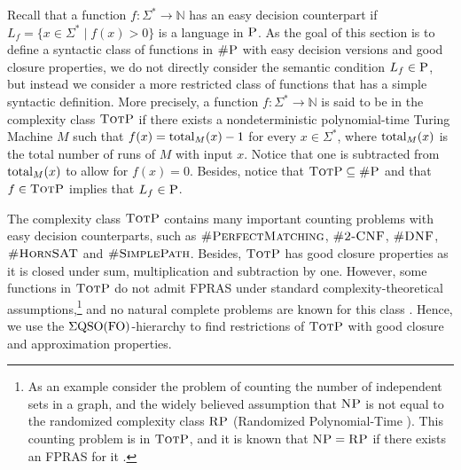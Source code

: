 
Recall that a function $f : \Sigma^* \to \mathbb{N}$ has an easy decision counterpart if $L_f = \{ x \in \Sigma^* \mid f(x) > 0 \}$ is a language in $\text{\sc P}$. As the goal of this section is to define a syntactic class of functions in $\text{\sc \#P}$ with easy decision versions and good closure properties, we do not directly consider the semantic condition $L_f  \in \text{\sc P}$, but instead we consider a more restricted class of functions that has a simple syntactic definition. More precisely, a function $f : \Sigma^* \to \mathbb{N}$ is said to be in the complexity class $\text{\sc TotP}$ \cite{PagourtzisZ06} if there exists a nondeterministic polynomial-time Turing Machine $M$ such that $f(x) = \text{\rm total}_M(x) - 1$ for every $x \in \Sigma^*$, where $\text{\rm total}_M(x)$ is the total number of runs of $M$ with input $x$. Notice that one is subtracted from $\text{\rm total}_M(x)$ to allow for $f(x) = 0$. Besides, notice that $\text{\sc TotP} \subseteq \text{\sc \#P}$ and that $f \in \text{\sc TotP}$ implies that $L_f \in \text{\sc P}$.

The complexity class $\text{\sc TotP}$ contains many important counting problems with easy decision counterparts, such as $\textsc{\#PerfectMatching}$, $\ctwcnf$, $\textsc{\#DNF}$, $\textsc{\#HornSAT}$ and $\textsc{\#SimplePath}$. Besides, $\text{\sc TotP}$ has good closure properties as it is closed under sum, multiplication and subtraction by one. However, some functions in $\text{\sc TotP}$ do not admit FPRAS under standard complexity-theoretical assumptions,\footnote{As an example consider the problem of counting the number of independent sets in a graph, and the widely believed assumption that $\text{\sc NP}$ is not equal to the randomized complexity class $\text{\sc RP}$ (Randomized Polynomial-Time \cite{G77}). This counting problem is in $\text{\sc TotP}$, and it is known that $\text{\sc NP} = \text{\sc RP}$ if there exists an FPRAS for it \cite{DFJ02}.} and no natural complete problems are known for this class \cite{PagourtzisZ06}. Hence, we use the $\Sigma{\rm QSO}({\rm FO})$-hierarchy to find restrictions of $\text{\sc TotP}$ with good closure and approximation properties.


